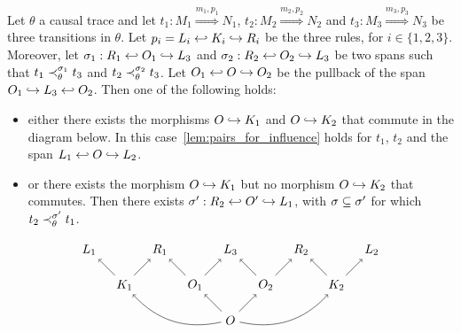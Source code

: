 \begin{lemma}
  \label{lem:constraint_pos_meet}
  Let $\theta$ a causal trace and let $t_1:M_1\overset{m_1,p_1}{\Rightarrow}N_1$, $t_2:M_2\overset{m_2,p_2}{\Rightarrow}N_2$ and $t_3:M_3\overset{m_3,p_3}{\Rightarrow}N_3$ be three transitions in $\theta$. Let $p_i = L_i\hookleftarrow K_i \hookrightarrow R_i$ be the three rules, for $i\in\{1,2,3\}$.
  Moreover, let $\sigma_1:R_1\hookleftarrow O_1\hookrightarrow L_3$ and $\sigma_2:R_2\hookleftarrow O_2\hookrightarrow L_3$ be two spans such that $t_1\prec^{\sigma_1}_{\theta} t_3$ and $t_2\prec^{\sigma_2}_{\theta} t_3$.
     Let $O_1\hookleftarrow O\hookrightarrow O_2$ be the pullback of the span $O_1\hookrightarrow L_3 \hookleftarrow O_2$. Then one of the following holds:
    \begin{itemize}
    \item either there exists the morphisms $O\hookrightarrow K_1$ and $O\hookrightarrow K_2$ that commute in the diagram below. In this case~\autoref{lem:pairs_for_influence} holds for $t_1$, $t_2$ and the span $L_1\hookleftarrow O\hookrightarrow L_2$.

    \item or there exists the morphism $O\hookrightarrow K_1$ but no morphism $O\hookrightarrow K_2$ that commutes. Then there exists $\sigma':R_2\hookleftarrow O'\hookrightarrow L_1$, with $\sigma\subseteq \sigma'$ for which $t_2\prec^{\sigma'}_{\theta} t_1$.
    \end{itemize}
   \[
    \begin{tikzpicture} %
      \node (o) at (0,-1) {\(O\)};
      \node (r3) at (0,1) {\(L_3\)};
      \node (o1) at (-1,0) {\(O_1\)};
      \node (o2) at (1,0) {\(O_2\)};
      \node (r1) at (-2,1) {\(R_1\)};
      \node (r2) at (2,1) {\(R_2\)};
      \node (l1) at (-4,1) {\(L_1\)};
      \node (l2) at (4,1) {\(L_2\)};
      \node (k1) at (-3,0) {\(K_1\)};
      \node (k2) at (3,0) {\(K_2\)};
      \draw [->] (o) -- (o1);
      \draw [->] (o) -- (o2);
      \draw [->] (o1) -- (r3);
      \draw [->] (o2) -- (r3);
      \draw [->] (o1) -- (r1);
      \draw [->] (o2) -- (r2);
      \draw [->] (k1) -- (r1);
      \draw [->] (k2) -- (r2);
      \draw [->] (k1) -- (l1);
      \draw [->] (k2) -- (l2);
      \draw [->] (o) to [bend left] (k1);
      \draw [->] (o) to [bend right] (k2);
    \end{tikzpicture}
    \]
\end{lemma}
